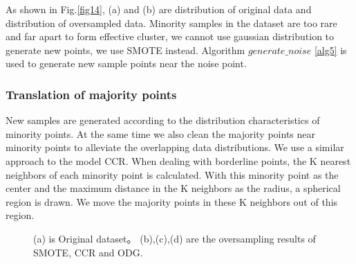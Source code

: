 \documentclass[runningheads]{llncs}
\begin{document}
As shown in Fig.\ref{fig14}, (a) and (b) are distribution of original data and 
distribution
 of oversampled data.
Minority samples in the dataset are too rare and far apart to form effective cluster, we cannot use
gaussian distribution to generate new points, we use SMOTE instead.
Algorithm $generate\_noise$ \ref{alg5} is used to generate new sample points near the noise point.
\subsubsection{Translation of majority points}
New samples are generated according to the 
distribution characteristics of minority points. 
At the same time we also clean the majority points
 near minority points to alleviate the overlapping data distributions.
We use a similar approach to the model CCR\cite{2017CCR}.
When dealing with borderline points, 
the K nearest neighbors of each minority point is calculated. 
With this minority point as the center and the maximum distance in the K neighbors as the radius, 
a spherical region is drawn. We move the majority points in these K neighbors out of this region.

\begin{figure}[tb]
  \centering
  \quad
  \quad
  \quad
  \caption{(a) is Original dataset。
  (b),(c),(d) are the oversampling results of SMOTE, CCR and ODG.}
  \label{fig18}
  \end{figure}
\end{document}
